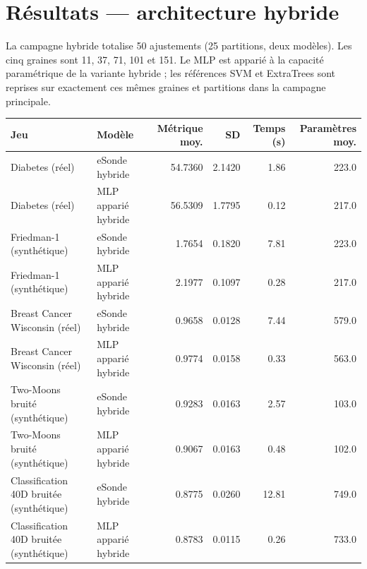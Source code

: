 \documentclass[11pt,a4paper]{article}
\begin{document}
\section{Résultats — architecture hybride}
La campagne hybride totalise 50 ajustements (25 partitions, deux modèles). Les cinq graines sont 11, 37, 71, 101 et 151. Le MLP est apparié à la capacité paramétrique de la variante hybride ; les références SVM et ExtraTrees sont reprises sur exactement ces mêmes graines et partitions dans la campagne principale.
\begin{longtable}{p{3.2cm}p{2.65cm}r r r r}
\toprule Jeu & Modèle & Métrique moy. & SD & Temps (s) & Paramètres moy.\\\midrule\endhead
Diabetes (réel) & eSonde hybride & 54.7360 & 2.1420 & 1.86 & 223.0 \\
Diabetes (réel) & MLP apparié hybride & 56.5309 & 1.7795 & 0.12 & 217.0 \\
Friedman-1 (synthétique) & eSonde hybride & 1.7654 & 0.1820 & 7.81 & 223.0 \\
Friedman-1 (synthétique) & MLP apparié hybride & 2.1977 & 0.1097 & 0.28 & 217.0 \\
Breast Cancer Wisconsin (réel) & eSonde hybride & 0.9658 & 0.0128 & 7.44 & 579.0 \\
Breast Cancer Wisconsin (réel) & MLP apparié hybride & 0.9774 & 0.0158 & 0.33 & 563.0 \\
Two-Moons bruité (synthétique) & eSonde hybride & 0.9283 & 0.0163 & 2.57 & 103.0 \\
Two-Moons bruité (synthétique) & MLP apparié hybride & 0.9067 & 0.0163 & 0.48 & 102.0 \\
Classification 40D bruitée (synthétique) & eSonde hybride & 0.8775 & 0.0260 & 12.81 & 749.0 \\
Classification 40D bruitée (synthétique) & MLP apparié hybride & 0.8783 & 0.0115 & 0.26 & 733.0 \\
\bottomrule\end{longtable}
\end{document}
